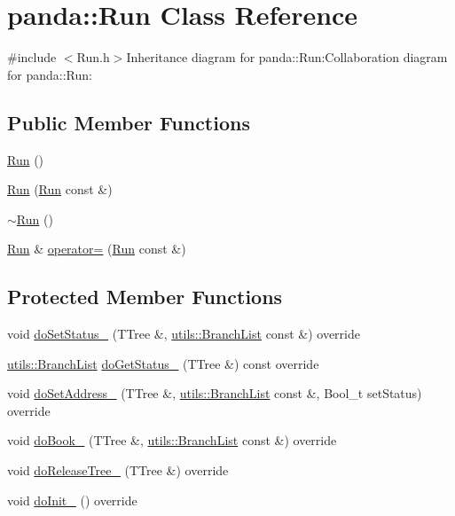 \hypertarget{classpanda_1_1Run}{
\section{panda::Run Class Reference}
\label{classpanda_1_1Run}
}


{\ttfamily \#include $<$Run.h$>$}Inheritance diagram for panda::Run:Collaboration diagram for panda::Run:\subsection*{Public Member Functions}
\begin{DoxyCompactItemize}
\item 
\hyperlink{classpanda_1_1Run_a7b1be463c73f157e7c0eb8520666467b}{Run} ()
\item 
\hyperlink{classpanda_1_1Run_a827427116d35b287c0264f08ab7ed84b}{Run} (\hyperlink{classpanda_1_1Run}{Run} const \&)
\item 
\hyperlink{classpanda_1_1Run_a831dc947243fba5f4f7801b32d91e1ce}{$\sim$Run} ()
\item 
\hyperlink{classpanda_1_1Run}{Run} \& \hyperlink{classpanda_1_1Run_a24e3e257fd9432fdec3a307b3a6eb6a3}{operator=} (\hyperlink{classpanda_1_1Run}{Run} const \&)
\end{DoxyCompactItemize}
\subsection*{Protected Member Functions}
\begin{DoxyCompactItemize}
\item 
void \hyperlink{classpanda_1_1Run_a6e0400b56778094d6ac8c6c9aa8eba3a}{doSetStatus\_\-} (TTree \&, \hyperlink{classpanda_1_1utils_1_1BranchList}{utils::BranchList} const \&) override
\item 
\hyperlink{classpanda_1_1utils_1_1BranchList}{utils::BranchList} \hyperlink{classpanda_1_1Run_a624aa12a6f703dbedea314cf69f1f04f}{doGetStatus\_\-} (TTree \&) const override
\item 
void \hyperlink{classpanda_1_1Run_a1fed64cabd5142e8b6981fdbadd9d2ae}{doSetAddress\_\-} (TTree \&, \hyperlink{classpanda_1_1utils_1_1BranchList}{utils::BranchList} const \&, Bool\_\-t setStatus) override
\item 
void \hyperlink{classpanda_1_1Run_a7f6f2652e76aa39c2e584ce97d1245d3}{doBook\_\-} (TTree \&, \hyperlink{classpanda_1_1utils_1_1BranchList}{utils::BranchList} const \&) override
\item 
void \hyperlink{classpanda_1_1Run_a8a59dc2c95b3a5e3bc43040c119320cd}{doReleaseTree\_\-} (TTree \&) override
\item 
void \hyperlink{classpanda_1_1Run_ab2308a77944053b5ad6939cb3e63041f}{doInit\_\-} () override
\end{DoxyCompactItemize}


